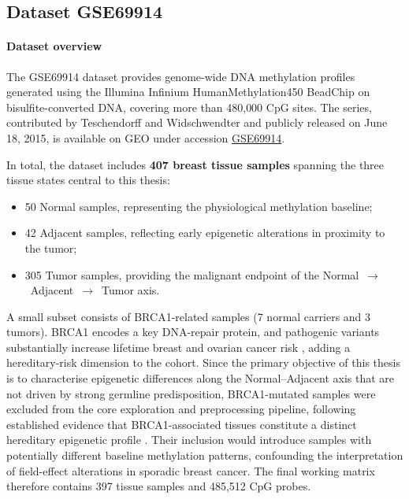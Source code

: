 \documentclass[10pt]{extarticle}
\begin{document}
\subsection{Dataset GSE69914}
\label{subsec:gse69914}

\paragraph{Dataset overview}
\label{par:gse69914_overview}

The GSE69914 dataset provides genome-wide DNA methylation profiles generated using the 
Illumina Infinium HumanMethylation450 BeadChip on bisulfite-converted DNA, covering more than 
480{,}000 CpG sites. The series, contributed by Teschendorff and Widschwendter and publicly 
released on June 18, 2015, is available on GEO under accession 
\href{https://www.ncbi.nlm.nih.gov/geo/query/acc.cgi?acc=GSE69914}{GSE69914}.

In total, the dataset includes \textbf{407 breast tissue samples} spanning the three tissue states central 
to this thesis:
\begin{itemize}[label=-]
    \item 50 Normal samples, representing the physiological methylation baseline;
    \item 42 Adjacent samples, reflecting early epigenetic alterations in proximity to the tumor;
    \item 305 Tumor samples, providing the malignant endpoint of the Normal~$\rightarrow$~Adjacent~$\rightarrow$~Tumor axis.
\end{itemize}

A small subset consists of BRCA1-related samples (7 normal carriers and 3 tumors).
BRCA1 encodes a key DNA-repair protein, and pathogenic variants substantially increase lifetime breast and ovarian cancer
risk \cite{brca_factsheet}, adding a hereditary-risk dimension to the cohort.
Since the primary objective of this thesis is to characterise epigenetic differences along the Normal–Adjacent
axis that are not driven by strong germline predisposition, BRCA1-mutated samples were excluded from the core exploration
and preprocessing pipeline, following established evidence that BRCA1-associated tissues constitute a distinct hereditary epigenetic profile \cite{Bartlett2022,Suijkerbuijk2008}.
Their inclusion would introduce samples with potentially different baseline methylation patterns, confounding the interpretation of field-effect alterations in sporadic breast cancer.
The final working matrix therefore contains 397 tissue samples and 485{,}512 CpG probes.
\end{document}
